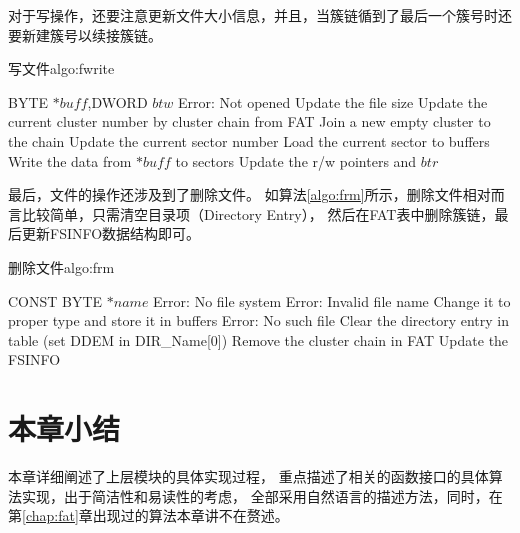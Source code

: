 对于写操作，还要注意更新文件大小信息，并且，当簇链循到了最后一个簇号时还要新建簇号以续接簇链。
\begin{balgo}{写文件}{algo:fwrite}
\begin{algorithmic}[1]
\Require BYTE $*buff$,\quad DWORD $btw$ 
    \State \Return Error: Not opened
\EndIf
{}
    \State Update the file size
\EndIf
\Repeat
{}
        \State Update the current cluster number by cluster chain from FAT
            \State Join a new empty cluster to the chain
        \EndIf
    \Else
        \State Update the current sector number
    \EndIf
\EndIf
\State Load the current sector to buffers
\State Write the data from $*buff$ to sectors
\State Update the r/w pointers and $btr$
\end{algorithmic}
\end{balgo}

最后，文件的操作还涉及到了删除文件。
如算法\ref{algo:frm}所示，删除文件相对而言比较简单，只需清空目录项（Directory Entry），
然后在FAT表中删除簇链，最后更新FSINFO数据结构即可。
\begin{balgo}{删除文件}{algo:frm}
\begin{algorithmic}[1]
\Require CONST BYTE $*name$
    \State \Return Error: No file system
\EndIf
{}
    \State \Return Error: Invalid file name
\Else
    \State Change it to proper type and store it in buffers
\EndIf
{}
    \State \Return Error: No such file
\EndIf
\State Clear the directory entry in table (set DDEM in DIR\_Name[0])
\State Remove the cluster chain in FAT
\State Update the FSINFO
\end{algorithmic}
\end{balgo}


\section{本章小结}
\label{sec:sum4}
本章详细阐述了上层模块的具体实现过程，
重点描述了相关的函数接口的具体算法实现，出于简洁性和易读性的考虑，
全部采用自然语言的描述方法，同时，在第\ref{chap:fat}章出现过的算法本章讲不在赘述。
